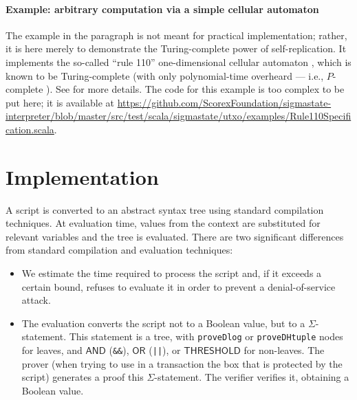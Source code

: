 \documentclass[11pt]{article}
\newcommand{\authnote}[2]{\marginpar{\parbox{\marginparwidth}{\tiny %
  \textsf{#1 {\textcolor{blue}{notes: #2}}}}}%
  \textcolor{blue}{\textbf{\dag}}}
\newcommand{\authnote}[2]{
  \textsf{#1 \textcolor{blue}{: #2}}}
\newcommand{\authnote}[2]{}
\newcommand{\lnote}[1]{{\authnote{\textcolor{orange}{Leo notes}}{#1}}}
\newcommand{\ignore}[1]{}
\newcommand{\andnode}{\ensuremath{\mathsf{AND}}}
\newcommand{\ornode}{\ensuremath{\mathsf{OR}}}
\newcommand{\tnode}{\ensuremath{\mathsf{THRESHOLD}}}
\begin{document}
\paragraph{Example: arbitrary computation via a simple cellular automaton}
The example in the paragraph is not meant for practical implementation; rather, it is here merely to demonstrate the Turing-complete power of self-replication. It implements the so-called ``rule 110'' one-dimensional cellular automaton \cite{wolfram1986theory}, which is known to be Turing-complete \cite{cook2004universality} (with only polynomial-time overheard --- i.e., $P$-complete \cite{NW06}). See \cite{CKM18}  for more details. The code for this example is too complex to be put here; it is available at
\url{https://github.com/ScorexFoundation/sigmastate-interpreter/blob/master/src/test/scala/sigmastate/utxo/examples/Rule110Specification.scala}.


\ignore{
\subsection{Merkle Trees}
Explain \texttt{isMember} and provide an example of usage. Explain that the context also contains the root hash of the all the unspent output boxes in the previous block \lnote{check: previous or current block? It would seem that the current is not available, so it should be previous.}, available via the predefined variable \texttt{LastBlockUtxoRootHash}. Give examples of usage, such as oracle, MAST, FSM. (For the oracle, explain that our language is rich enough to support signature verification within the script.)
}




\section{Implementation}
\label{sec:impl}
A script is converted to an abstract syntax tree using standard compilation techniques. At evaluation time, values from the context are substituted for relevant variables and the tree is evaluated. There are two significant differences from standard compilation and evaluation techniques:

\begin{itemize}
\item We estimate the time required to process the script and, if it exceeds a certain bound, refuses to evaluate it in order to prevent a denial-of-service attack.
\item The evaluation converts the script not to a Boolean value, but to a $\Sigma$-statement. This statement is a tree, with  \texttt{proveDlog} or \texttt{proveDHtuple} nodes for leaves, and $\andnode$ (\texttt{\&\&}), $\ornode$ (\texttt{||}), or $\tnode$ for  non-leaves. The prover (when trying to use in a transaction the box that is protected by the script) generates a proof this $\Sigma$-statement. The verifier verifies it, obtaining a Boolean value.
\end{itemize}
\end{document}
